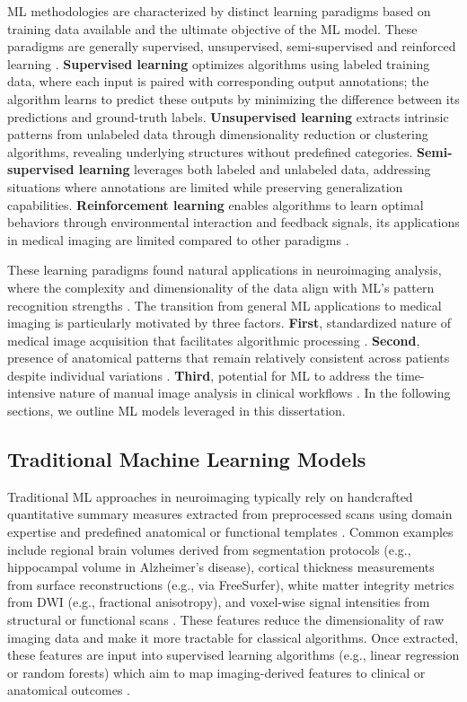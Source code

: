ML methodologies are characterized by distinct learning paradigms based on training data available and the ultimate objective of the ML model. These paradigms are generally supervised, unsupervised, semi-supervised and reinforced learning \cite{Hastie2009-ef}. \textbf{Supervised learning} optimizes algorithms using labeled training data, where each input is paired with corresponding output annotations; the algorithm learns to predict these outputs by minimizing the difference between its predictions and ground-truth labels. \textbf{Unsupervised learning} extracts intrinsic patterns from unlabeled data through dimensionality reduction or clustering algorithms, revealing underlying structures without predefined categories. \textbf{Semi-supervised learning} leverages both labeled and unlabeled data, addressing situations where annotations are limited while preserving generalization capabilities. \textbf{Reinforcement learning} enables algorithms to learn optimal behaviors through environmental interaction and feedback signals, its applications in medical imaging are limited compared to other paradigms \cite{Zhou2021-au}. 

These learning paradigms found natural applications in neuroimaging analysis, where the complexity and dimensionality of the data align with ML's pattern recognition strengths \cite{Vieira2017-vr}. The transition from general ML applications to medical imaging is particularly motivated by three factors. \textbf{First},  standardized nature of medical image acquisition that facilitates algorithmic processing  \cite{Li2020-dy}. \textbf{Second}, presence of anatomical patterns that remain relatively consistent across patients despite individual variations \cite{Iglesias2023-co}. \textbf{Third},  potential for ML to address the time-intensive nature of manual image analysis in clinical workflows \cite{Khalifa2024-dn}. In the following sections, we outline ML models leveraged in this dissertation. 

\subsection{Traditional Machine Learning Models}
Traditional ML approaches in neuroimaging typically rely on handcrafted quantitative summary measures extracted from preprocessed scans using domain expertise and predefined anatomical or functional templates \cite{Mwangi2014-nl}. Common examples include regional brain volumes derived from segmentation protocols (e.g., hippocampal volume in Alzheimer’s disease), cortical thickness measurements from surface reconstructions (e.g., via FreeSurfer), white matter integrity metrics from DWI (e.g., fractional anisotropy), and voxel-wise signal intensities from structural or functional scans \cite{Abraham2014-va, Coupe2019-pe}. These features reduce the dimensionality of raw imaging data and make it more tractable for classical algorithms. Once extracted, these features are input into supervised learning algorithms (e.g., linear regression or random forests) which aim to map imaging-derived features to clinical or anatomical outcomes \cite{Mateos-Perez2018-xb,Jollans2019-mv,Sarica2017-dz}.

